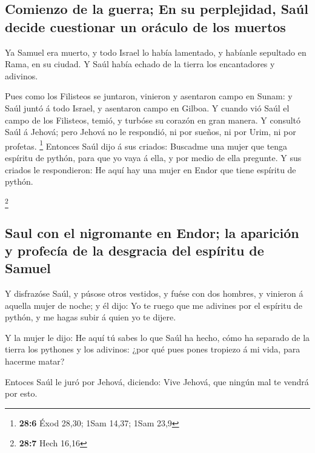 \hypertarget{comienzo-de-la-guerra-en-su-perplejidad-sauxfal-decide-cuestionar-un-oruxe1culo-de-los-muertos}{%
\subsection{Comienzo de la guerra; En su perplejidad, Saúl decide
cuestionar un oráculo de los
muertos}\label{comienzo-de-la-guerra-en-su-perplejidad-sauxfal-decide-cuestionar-un-oruxe1culo-de-los-muertos}}

 Ya Samuel era muerto, y todo Israel lo había lamentado, y
habíanle sepultado en Rama, en su ciudad. Y Saúl había echado de la
tierra los encantadores y adivinos.

 Pues como los Filisteos se juntaron, vinieron y asentaron
campo en Sunam: y Saúl juntó á todo Israel, y asentaron campo en Gilboa.
 Y cuando vió Saúl el campo de los Filisteos, temió, y
turbóse su corazón en gran manera.  Y consultó Saúl á
Jehová; pero Jehová no le respondió, ni por sueños, ni por Urim, ni por
profetas. \footnote{\textbf{28:6} Éxod 28,30; 1Sam 14,37; 1Sam 23,9}
 Entonces Saúl dijo á sus criados: Buscadme una mujer que
tenga espíritu de pythón, para que yo vaya á ella, y por medio de ella
pregunte. Y sus criados le respondieron: He aquí hay una mujer en Endor
que tiene espíritu de pythón.

\footnote{\textbf{28:7} Hech 16,16}

\hypertarget{saul-con-el-nigromante-en-endor-la-apariciuxf3n-y-profecuxeda-de-la-desgracia-del-espuxedritu-de-samuel}{%
\subsection{Saul con el nigromante en Endor; la aparición y profecía de
la desgracia del espíritu de
Samuel}\label{saul-con-el-nigromante-en-endor-la-apariciuxf3n-y-profecuxeda-de-la-desgracia-del-espuxedritu-de-samuel}}

 Y disfrazóse Saúl, y púsose otros vestidos, y fuése con dos
hombres, y vinieron á aquella mujer de noche; y él dijo: Yo te ruego que
me adivines por el espíritu de pythón, y me hagas subir á quien yo te
dijere.

 Y la mujer le dijo: He aquí tú sabes lo que Saúl ha hecho,
cómo ha separado de la tierra los pythones y los adivinos: ¿por qué pues
pones tropiezo á mi vida, para hacerme matar?

 Entoces Saúl le juró por Jehová, diciendo: Vive Jehová,
que ningún mal te vendrá por esto.

